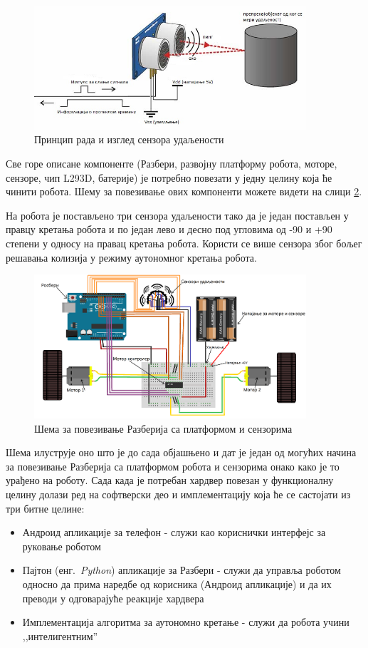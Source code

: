 \documentclass[12pt,oneside]{memoir}
\theoremstyle{remark}
\begin{document}
\begin{figure}[!ht]
\centering
\includegraphics[width=0.9\textwidth]{slike/UltrasonicSensors.jpg}
\caption{Принцип рада и изглед сензора удаљености }
\label{fig:ultrasonicsensor}
\end{figure}

Све горе описане компоненте (Разбери, развојну платформу робота, моторе, сензоре, чип L293D, батерије) је потребно повезати у једну целину која ће чинити робота. Шему за повезивање ових компоненти можете видети на слици \ref{fig:mainshema}.

На робота је постављено три сензора удаљености тако да је један постављен у правцу кретања робота и по један лево и десно под угловима од -90 и +90 степени у односу на правац кретања робота. Користи се више сензора због бољег решавања колизија у режиму аутономног кретања робота.

\begin{figure}[!ht]
\centering
\includegraphics[width=0.9\textwidth]{slike/shema.png}
\caption{Шема за повезивање Разберија са платформом и сензорима }
\label{fig:mainshema}
\end{figure}

Шема илуструје оно што је до сада објашњено и дат је један од могућих начина за повезивање Разберија са платформом робота и сензорима онако како је то урађено на роботу. Сада када је потребан хардвер повезан у функционалну целину долази ред на софтверски део и имплементацију која ће се састојати из три битне целине:
\begin{itemize}
\item Андроид апликације за телефон - служи као кориснички интерфејс за руковање роботом
\item Пајтон  (енг.~{\em Python}) апликације за Разбери - служи да управља роботом односно да прима наредбе од корисника (Андроид апликације) и да их преводи у одговарајуће реакције хардвера
\item Имплементација алгоритма за аутономно кретање - служи да робота учини ,,интелигентним''
\end{itemize}
\end{document}
